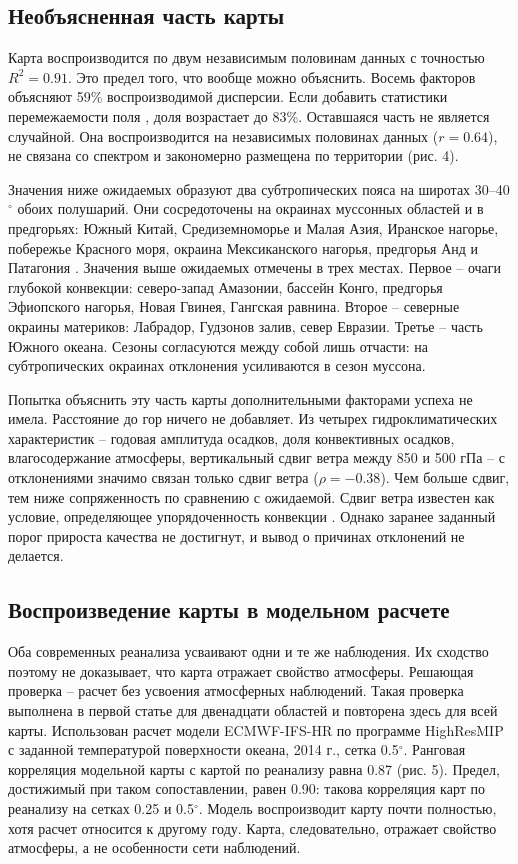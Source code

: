 \documentclass[12pt,a4paper]{article}
\begin{document}
\subsection{Необъясненная часть карты}

Карта воспроизводится по двум независимым половинам данных с точностью $R^2 = 0.91$. Это предел того, что вообще можно объяснить. Восемь факторов объясняют 59\% воспроизводимой дисперсии. Если добавить статистики перемежаемости поля \cite{Kolmogorov1962}, доля возрастает до 83\%. Оставшаяся часть не является случайной. Она воспроизводится на независимых половинах данных ($r = 0.64$), не связана со спектром и закономерно размещена по территории (рис. 4).

Значения ниже ожидаемых образуют два субтропических пояса на широтах 30--40$^\circ$ обоих полушарий. Они сосредоточены на окраинах муссонных областей и в предгорьях: Южный Китай, Средиземноморье и Малая Азия, Иранское нагорье, побережье Красного моря, окраина Мексиканского нагорья, предгорья Анд и Патагония \cite{RodwellHoskins1996}. Значения выше ожидаемых отмечены в трех местах. Первое -- очаги глубокой конвекции: северо-запад Амазонии, бассейн Конго, предгорья Эфиопского нагорья, Новая Гвинея, Гангская равнина. Второе -- северные окраины материков: Лабрадор, Гудзонов залив, север Евразии. Третье -- часть Южного океана. Сезоны согласуются между собой лишь отчасти: на субтропических окраинах отклонения усиливаются в сезон муссона.

Попытка объяснить эту часть карты дополнительными факторами успеха не имела. Расстояние до гор ничего не добавляет. Из четырех гидроклиматических характеристик -- годовая амплитуда осадков, доля конвективных осадков, влагосодержание атмосферы, вертикальный сдвиг ветра между 850 и 500 гПа -- с отклонениями значимо связан только сдвиг ветра ($\rho = -0.38$). Чем больше сдвиг, тем ниже сопряженность по сравнению с ожидаемой. Сдвиг ветра известен как условие, определяющее упорядоченность конвекции \cite{RotunnoKlempWeisman1988,Wing2017}. Однако заранее заданный порог прироста качества не достигнут, и вывод о причинах отклонений не делается.

\subsection{Воспроизведение карты в модельном расчете}

Оба современных реанализа усваивают одни и те же наблюдения. Их сходство поэтому не доказывает, что карта отражает свойство атмосферы. Решающая проверка -- расчет без усвоения атмосферных наблюдений. Такая проверка выполнена в первой статье для двенадцати областей и повторена здесь для всей карты. Использован расчет модели ECMWF-IFS-HR по программе HighResMIP \cite{Haarsma2016,Roberts2018} с заданной температурой поверхности океана, 2014 г., сетка 0.5$^\circ$. Ранговая корреляция модельной карты с картой по реанализу равна 0.87 (рис. 5). Предел, достижимый при таком сопоставлении, равен 0.90: такова корреляция карт по реанализу на сетках 0.25 и 0.5$^\circ$. Модель воспроизводит карту почти полностью, хотя расчет относится к другому году. Карта, следовательно, отражает свойство атмосферы, а не особенности сети наблюдений.
\end{document}
